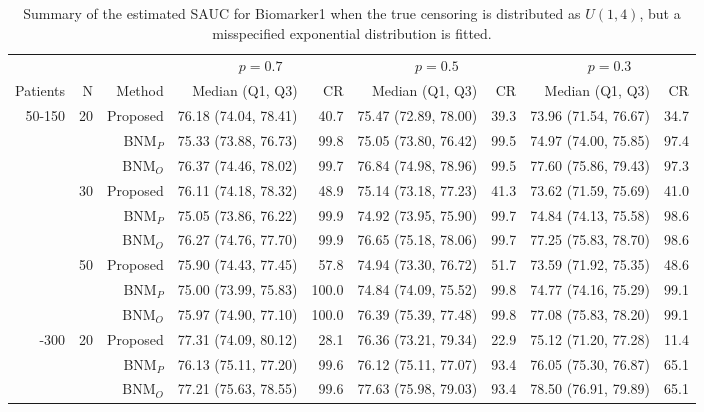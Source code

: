 \begin{table}[!htb]

\caption{\label{tab:sauc3}Summary of the estimated SAUC for Biomarker1 when the true censoring is distributed as $U(1,4)$, but a misspecified exponential distribution is fitted.}
\centering
\begin{threeparttable}
\begin{tabular}[t]{rrrrrrrrr}
\toprule
\multicolumn{1}{c}{} & \multicolumn{1}{c}{} & \multicolumn{1}{c}{} & \multicolumn{2}{c}{$p = 0.7$} & \multicolumn{2}{c}{$p = 0.5$} & \multicolumn{2}{c}{$p = 0.3$} \\
\cmidrule(l{3pt}r{3pt}){4-5} \cmidrule(l{3pt}r{3pt}){6-7} \cmidrule(l{3pt}r{3pt}){8-9}
Patients & N & Method & Median (Q1, Q3) & CR & Median (Q1, Q3) & CR & Median (Q1, Q3) & CR\\
\midrule
50-150 & 20 & Proposed & 76.18 (74.04, 78.41) & 40.7 & 75.47 (72.89, 78.00) & 39.3 & 73.96 (71.54, 76.67) & 34.7\\
 &  & BNM$_P$ & 75.33 (73.88, 76.73) & 99.8 & 75.05 (73.80, 76.42) & 99.5 & 74.97 (74.00, 75.85) & 97.4\\
 &  & BNM$_O$ & 76.37 (74.46, 78.02) & 99.7 & 76.84 (74.98, 78.96) & 99.5 & 77.60 (75.86, 79.43) & 97.3\\
\addlinespace
 & 30 & Proposed & 76.11 (74.18, 78.32) & 48.9 & 75.14 (73.18, 77.23) & 41.3 & 73.62 (71.59, 75.69) & 41.0\\
 &  & BNM$_P$ & 75.05 (73.86, 76.22) & 99.9 & 74.92 (73.95, 75.90) & 99.7 & 74.84 (74.13, 75.58) & 98.6\\
 &  & BNM$_O$ & 76.27 (74.76, 77.70) & 99.9 & 76.65 (75.18, 78.06) & 99.7 & 77.25 (75.83, 78.70) & 98.6\\
\addlinespace
 & 50 & Proposed & 75.90 (74.43, 77.45) & 57.8 & 74.94 (73.30, 76.72) & 51.7 & 73.59 (71.92, 75.35) & 48.6\\
 &  & BNM$_P$ & 75.00 (73.99, 75.83) & 100.0 & 74.84 (74.09, 75.52) & 99.8 & 74.77 (74.16, 75.29) & 99.1\\
 &  & BNM$_O$ & 75.97 (74.90, 77.10) & 100.0 & 76.39 (75.39, 77.48) & 99.8 & 77.08 (75.83, 78.20) & 99.1\\
\addlinespace
50-300 & 20 & Proposed & 77.31 (74.09, 80.12) & 28.1 & 76.36 (73.21, 79.34) & 22.9 & 75.12 (71.20, 77.28) & 11.4\\
 &  & BNM$_P$ & 76.13 (75.11, 77.20) & 99.6 & 76.12 (75.11, 77.07) & 93.4 & 76.05 (75.30, 76.87) & 65.1\\
 &  & BNM$_O$ & 77.21 (75.63, 78.55) & 99.6 & 77.63 (75.98, 79.03) & 93.4 & 78.50 (76.91, 79.89) & 65.1\\

\end{tabular}
\end{threeparttable}
\end{table}
